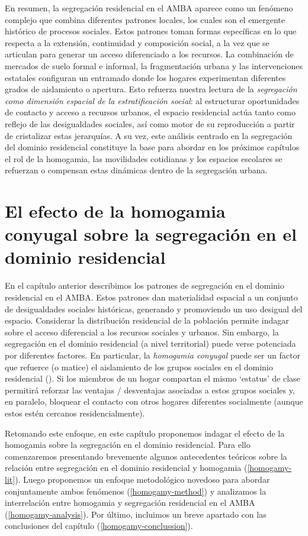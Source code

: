 \documentclass[
  spanish,
  a4paper,%
  chapterprefix=true,%
  DIV=calc,%
  twoside]{scrbook}%
\begin{document}
En resumen, la segregación residencial en el AMBA aparece como un
fenómeno complejo que combina diferentes patrones locales, los cuales
son el emergente histórico de procesos sociales. Estos patrones toman
formas específicas en lo que respecta a la extensión, continuidad y
composición social, a la vez que se articulan para generar un acceso
diferenciado a los recursos. La combinación de mercados de suelo formal
e informal, la fragmentación urbana y las intervenciones estatales
configuran un entramado donde los hogares experimentan diferentes grados
de aislamiento o apertura. Esto refuerza nuestra lectura de la
\emph{segregación como dimensión espacial de la estratificación social}: al
estructurar oportunidades de contacto y acceso a recursos urbanos, el
espacio residencial actúa tanto como reflejo de las desigualdades
sociales, así como motor de su reproducción a partir de cristalizar
estas jerarquías. A su vez, este análisis centrado en la segregación del
dominio residencial constituye la base para abordar en los próximos
capítulos el rol de la homogamia, las movilidades cotidianas y los
espacios escolares se refuerzan o compensan estas dinámicas dentro de la
segregación urbana.

\chapter{El efecto de la homogamia conyugal sobre la segregación en el dominio residencial}\label{homogamy}

En el capítulo anterior describimos los patrones de segregación en el
dominio residencial en el AMBA. Estos patrones dan materialidad espacial
a un conjunto de desigualdades sociales históricas, generando y
promoviendo un uso desigual del espacio. Considerar la distribución
residencial de la población permite indagar sobre el acceso diferencial
a los recursos sociales y urbanos. Sin embargo, la segregación en el
dominio residencial (a nivel territorial) puede verse potenciada por
diferentes factores. En particular, la \emph{homogamia conyugal} puede ser un
factor que refuerce (o matice) el aislamiento de los grupos sociales en
el dominio residencial (). Si los miembros de un hogar
compartan el mismo `estatus' de clase permitirá reforzar las ventajas /
desventajas asociadas a estos grupos sociales y, en paralelo, bloquear
el contacto con otros hogares diferentes socialmente (aunque estos estén
cercanos residencialmente).

Retomando este enfoque, en este capítulo proponemos indagar el efecto de
la homogamia sobre la segregación en el dominio residencial. Para ello
comenzaremos presentando brevemente algunos antecedentes teóricos sobre
la relación entre segregación en el dominio residencial y homogamia
(\ref{homogamy-lit}). Luego proponemos un enfoque metodológico novedoso
para abordar conjuntamente ambos fenómenos (\ref{homogamy-method}) y
analizamos la interrelación entre homogamia y segregación residencial en
el AMBA (\ref{homogamy-analysis}). Por último, incluimos un breve
apartado con las conclusiones del capítulo
(\ref{homogamy-conclussion}).
\end{document}

